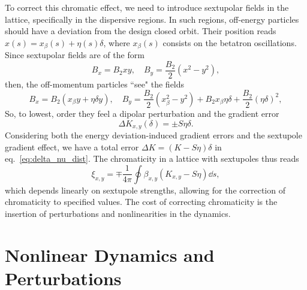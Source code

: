 To correct this chromatic effect,  we need to introduce sextupolar fields in the lattice, specifically in the dispersive regions. In such regions, off-energy particles should have a deviation from the design closed orbit. Their position reads $x(s)=x_{\beta}(s)+\eta(s) \delta$, where $x_{\beta}(s)$ consists on the betatron oscillations. Since sextupolar fields are of the form
$$B_{x}=B_{2} x y, \quad B_{y}= \frac{B_{2}}{2}(x^{2}-y^{2}),$$
then, the off-momentum particles ``see" the fields
$$B_{x}=B_{2}(x_\beta y + \eta \delta y), \quad B_{y}=\frac{B_{2}}{2}({x_\beta^{2}-y^{2}})+B_2 x_\beta \eta \delta + \frac{B_2}{2}(\eta \delta)^2,$$
So, to lowest, order they feel a dipolar perturbation and the gradient error
$$\Delta K_{x,y}(\delta)=\pm S\eta \delta.$$
Considering both the energy deviation-induced gradient errors and the sextupole gradient effect, we have a total error $\Delta K = (K - S\eta)\delta$ in eq.~\eqref{eq:delta_nu_dist}. The chromaticity in a lattice with sextupoles thus reads
\begin{equation*}
    \xi_{x,y}=\mp \frac{1}{4\pi}\oint\beta_{x,y}(K_{x,y}- S\eta)\dd s,
\end{equation*}
which depends linearly on sextupole strengths, allowing for the correction of chromaticity to specified values. The cost of correcting chromaticity is the insertion of perturbations and nonlinearities in the dynamics.

\section{Nonlinear Dynamics and Perturbations}
